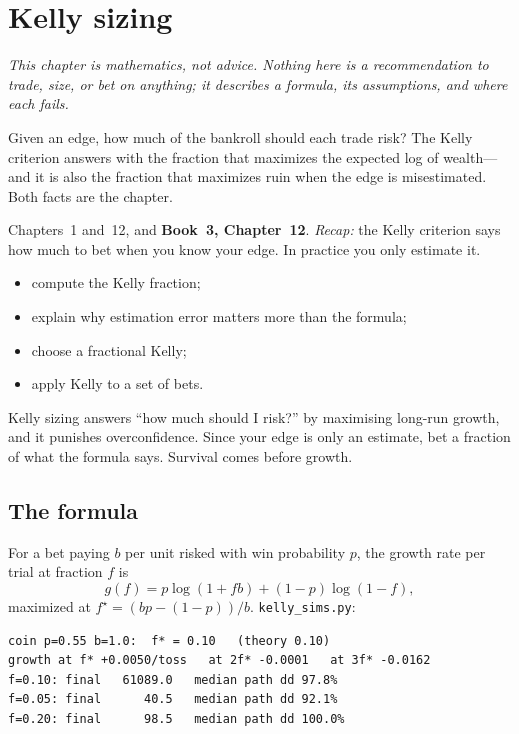 \chapter{Kelly sizing}\label{ch:kelly}

\noindent\emph{This chapter is mathematics, not advice. Nothing here is a recommendation
to trade, size, or bet on anything; it describes a formula, its assumptions, and where
each fails.}

\vspace{1em}
\noindent Given an edge, how much of the bankroll should each trade risk? The Kelly
criterion answers with the fraction that maximizes the expected log of wealth---and it
is also the fraction that maximizes ruin when the edge is misestimated. Both facts are
the chapter.

\begin{rulebox}
Chapters~1 and~12, and \textbf{Book~3, Chapter~12}. \emph{Recap:} the Kelly criterion says how much to bet when you know your edge. In practice you only estimate it.
\end{rulebox}
\begin{wins}
\begin{itemize}
\item compute the Kelly fraction;
\item explain why estimation error matters more than the formula;
\item choose a fractional Kelly;
\item apply Kelly to a set of bets.
\end{itemize}
\end{wins}
\begin{principle}
Kelly sizing answers ``how much should I risk?'' by maximising long-run growth, and it punishes overconfidence. Since your edge is only an estimate, bet a fraction of what the formula says. Survival comes before growth.
\end{principle}

\section{The formula}\label{sec:kelly}

For a bet paying $b$ per unit risked with win probability $p$, the growth rate per trial
at fraction $f$ is
\[
g(f)=p\log(1+fb)+(1-p)\log(1-f),
\]
maximized at $f^\star=(bp-(1-p))/b$. \texttt{kelly\_sims.py}:
\begin{lstlisting}[numbers=none]
coin p=0.55 b=1.0:  f* = 0.10   (theory 0.10)
growth at f* +0.0050/toss   at 2f* -0.0001   at 3f* -0.0162
f=0.10: final   61089.0   median path dd 97.8%
f=0.05: final      40.5   median path dd 92.1%
f=0.20: final      98.5   median path dd 100.0%
\end{lstlisting}

